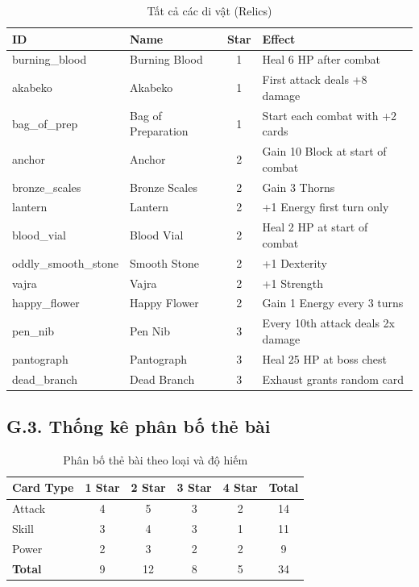 \begin{table}[H]
    \centering
    \caption{Tất cả các di vật (Relics)}
    \label{tab:all_relics}
    \begin{tabular}{l l c p{6cm}}
        \toprule
        \textbf{ID} & \textbf{Name} & \textbf{Star} & \textbf{Effect} \\
        \midrule
        burning\_blood & Burning Blood & 1 & Heal 6 HP after combat \\
        akabeko & Akabeko & 1 & First attack deals +8 damage \\
        bag\_of\_prep & Bag of Preparation & 1 & Start each combat with +2 cards \\
        anchor & Anchor & 2 & Gain 10 Block at start of combat \\
        bronze\_scales & Bronze Scales & 2 & Gain 3 Thorns  \\
        lantern & Lantern & 2 & +1 Energy first turn only \\
        blood\_vial & Blood Vial & 2 & Heal 2 HP at start of combat \\
        oddly\_smooth\_stone & Smooth Stone & 2 & +1 Dexterity \\
        vajra & Vajra & 2 & +1 Strength \\
        happy\_flower & Happy Flower & 2 & Gain 1 Energy every 3 turns \\
        pen\_nib & Pen Nib & 3 & Every 10th attack deals 2x damage \\
        pantograph & Pantograph & 3 & Heal 25 HP at boss chest \\
        dead\_branch & Dead Branch & 3 & Exhaust grants random card \\
        \bottomrule
    \end{tabular}
\end{table}

\subsection*{G.3. Thống kê phân bố thẻ bài}

\begin{table}[H]
    \centering
    \caption{Phân bố thẻ bài theo loại và độ hiếm}
    \label{tab:card_distribution}
    \begin{tabular}{l c c c c c}
        \toprule
        \textbf{Card Type} & \textbf{1 Star} & \textbf{2 Star} & \textbf{3 Star} & \textbf{4 Star} & \textbf{Total} \\
        \midrule
        Attack & 4 & 5 & 3 & 2 & 14 \\
        Skill & 3 & 4 & 3 & 1 & 11 \\
        Power & 2 & 3 & 2 & 2 & 9 \\
        \midrule
        \textbf{Total} & 9 & 12 & 8 & 5 & 34 \\
        \bottomrule
    \end{tabular}
\end{table}

